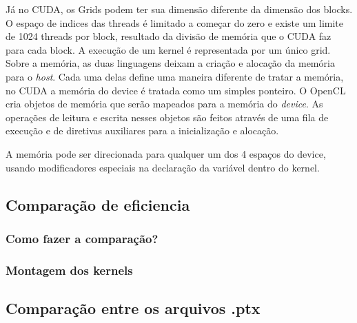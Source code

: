 Já no CUDA, os Grids podem ter sua dimensão diferente da dimensão dos blocks. O espaço de indices das threads é limitado a começar 
do zero e existe um limite de 1024 threads por block, resultado da divisão de memória que o CUDA faz para cada block. A execução
de um kernel é representada por um único grid.
\\

Sobre a memória, as duas linguagens deixam a criação e alocação da memória para o \textit{host}. Cada uma delas define uma maneira
diferente de tratar a memória, no CUDA a memória do device é tratada como um simples ponteiro. 
O OpenCL cria objetos de memória que serão
mapeados para a memória do \textit{device}. As operações de leitura e escrita nesses objetos são feitos através de uma fila de 
execução e de diretivas auxiliares para a inicialização e alocação.

A memória pode ser direcionada para qualquer um dos 4 espaços do device, usando modificadores especiais na declaração da variável
dentro do kernel.
\subsection{Comparação de eficiencia}
\subsubsection{Como fazer a comparação?}
\subsubsection{Montagem dos kernels}
\subsection{Comparação entre os arquivos .ptx}
